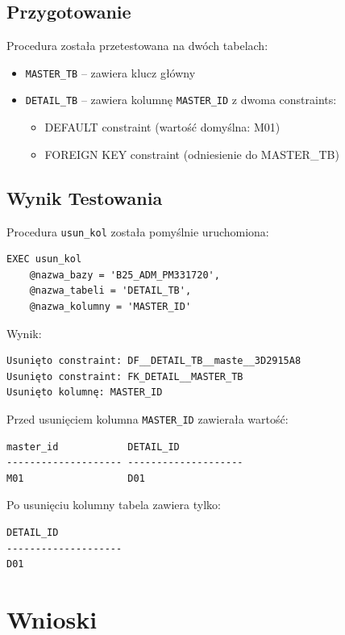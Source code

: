 \documentclass[a4paper,11pt]{article}
\begin{document}
	\subsection{Przygotowanie}
	
	Procedura została przetestowana na dwóch tabelach:
	\begin{itemize}
		\item \texttt{MASTER\_TB} -- zawiera klucz główny
		\item \texttt{DETAIL\_TB} -- zawiera kolumnę \texttt{MASTER\_ID} z dwoma constraints:
		\begin{itemize}
			\item DEFAULT constraint (wartość domyślna: M01)
			\item FOREIGN KEY constraint (odniesienie do MASTER\_TB)
		\end{itemize}
	\end{itemize}
	
	\subsection{Wynik Testowania}
	
	Procedura \texttt{usun\_kol} została pomyślnie uruchomiona:
	
	\begin{lstlisting}
EXEC usun_kol 
	@nazwa_bazy = 'B25_ADM_PM331720', 
	@nazwa_tabeli = 'DETAIL_TB', 
	@nazwa_kolumny = 'MASTER_ID'
	\end{lstlisting}
	
	Wynik:
	\begin{lstlisting}
Usunięto constraint: DF__DETAIL_TB__maste__3D2915A8
Usunięto constraint: FK_DETAIL__MASTER_TB
Usunięto kolumnę: MASTER_ID
	\end{lstlisting}
	
	Przed usunięciem kolumna \texttt{MASTER\_ID} zawierała wartość:
	\begin{lstlisting}
master_id            DETAIL_ID
-------------------- --------------------
M01                  D01
	\end{lstlisting}
	
	Po usunięciu kolumny tabela zawiera tylko:
	\begin{lstlisting}
DETAIL_ID
--------------------
D01
	\end{lstlisting}
	
	\section{Wnioski}
	
\end{document}
